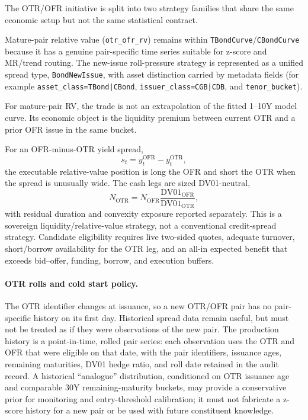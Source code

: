 The OTR/OFR initiative is split into two strategy families that share the same
economic setup but not the same statistical contract.

Mature-pair relative value (\texttt{otr\_ofr\_rv}) remains within
\texttt{TBondCurve}/\texttt{CBondCurve} because it has a genuine pair-specific
time series suitable for z-score and MR/trend routing. The new-issue roll-pressure
strategy is represented as a unified spread type, \texttt{BondNewIssue}, with
asset distinction carried by metadata fields (for example
\texttt{asset\_class=TBond|CBond}, \texttt{issuer\_class=CGB|CDB}, and
\texttt{tenor\_bucket}).

For mature-pair RV, the trade is not an extrapolation of the fitted 1--10Y model
curve. Its economic object is the liquidity premium between current OTR and a prior
OFR issue in the same bucket.

For an OFR-minus-OTR yield spread,
\begin{equation}
	s_t = y^{\mathrm{OFR}}_t - y^{\mathrm{OTR}}_t,
\end{equation}
the executable relative-value position is long the OFR and short the OTR when the
spread is unusually wide.  The cash legs are sized DV01-neutral,
\begin{equation}
	N_{\mathrm{OTR}} = N_{\mathrm{OFR}}
	\frac{\mathrm{DV01}_{\mathrm{OFR}}}{\mathrm{DV01}_{\mathrm{OTR}}},
\end{equation}
with residual duration and convexity exposure reported separately.  This is a
sovereign liquidity/relative-value strategy, not a conventional credit-spread
strategy.  Candidate eligibility requires live two-sided quotes, adequate turnover,
short/borrow availability for the OTR leg, and an all-in expected benefit that exceeds
bid--offer, funding, borrow, and execution buffers.

\paragraph{OTR rolls and cold start policy.}
The OTR identifier changes at issuance, so a new OTR/OFR pair has no pair-specific
history on its first day.  Historical spread data remain useful, but must not be
treated as if they were observations of the new pair.  The production history is a
point-in-time, rolled pair series: each observation uses the OTR and OFR that were
eligible on that date, with the pair identifiers, issuance ages, remaining maturities,
DV01 hedge ratio, and roll date retained in the audit record.  A historical
``analogue'' distribution, conditioned on OTR issuance age and comparable 30Y
remaining-maturity buckets, may provide a conservative prior for monitoring and
entry-threshold calibration; it must not fabricate a z-score history for a new pair
or be used with future constituent knowledge.

